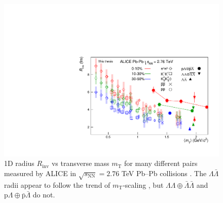 \begin{figure}[hbtp]
\includegraphics[width=36pc]{Figures/FitResults/2016-09-29-mTscaling.pdf}
\caption[$R_{\mathrm{inv}}$ vs $m_{\mathrm{T}}$]{1D radius $R_\mathrm{inv}$ vs transverse mass $m_\mathrm{T}$ for many different pairs measured by ALICE in $\sqrt{s_\mathrm{NN}} = 2.76$ TeV Pb--Pb collisions \cite{Adam:2015vja}.
The $\Lambda\bar{\Lambda}$ radii appear to follow the trend of $m_\mathrm{T}$-scaling \cite{Csorgo:1995bi,Lisa:2005dd}, but $\Lambda\Lambda\oplus\bar{\Lambda}\bar{\Lambda}$ and $\mathrm{p}\Lambda\oplus\bar{\mathrm{p}}\bar{\Lambda}$ do not.
}
\label{fig:RvsMt}
\end{figure}



